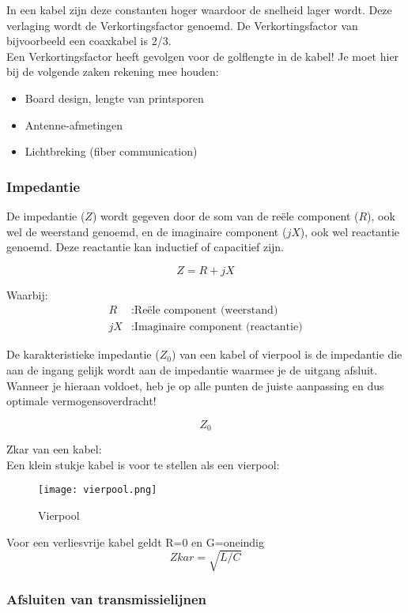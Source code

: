 In een kabel zijn deze constanten hoger waardoor de snelheid lager wordt. Deze verlaging wordt de Verkortingsfactor genoemd. De Verkortingsfactor van bijvoorbeeld een coaxkabel is 2/3.\\

Een Verkortingsfactor heeft  gevolgen voor de golflengte in de kabel! Je moet hier bij de volgende zaken rekening mee houden:
\begin{itemize}[label=$\bullet$]
    \item Board design, lengte van printsporen
    \item Antenne-afmetingen
    \item Lichtbreking (fiber communication)
\end{itemize}

\subsubsection{Impedantie}

De impedantie (\(Z\)) wordt gegeven door de som van de reële component (\(R\)), ook wel de weerstand genoemd, en de imaginaire component (\(jX\)), ook wel reactantie genoemd. Deze reactantie kan inductief of capacitief zijn.

\[
Z = R + jX
\]

Waarbij:
\begin{align*}
R & : \text{Reële component (weerstand)} \\
jX & : \text{Imaginaire component (reactantie)}
\end{align*}

De karakteristieke impedantie (\(Z_0\)) van een kabel of vierpool is de impedantie die aan de ingang gelijk wordt aan de impedantie waarmee je de uitgang afsluit. Wanneer je hieraan voldoet, heb je op alle punten de juiste aanpassing en dus optimale vermogensoverdracht!

\[
Z_0
\]

Zkar van een kabel: \\
Een klein stukje kabel is voor te stellen als een vierpool:
\begin{figure}[H]
\centering
\texttt{[image: vierpool.png]}
\caption{Vierpool}
\end{figure}
Voor een verliesvrije kabel geldt R=0 en G=oneindig
\[
Zkar = \sqrt{L / C}
\]

\subsubsection{Afsluiten van transmissielijnen}

